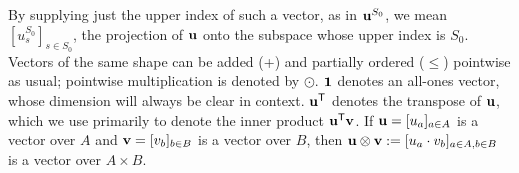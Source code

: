 \documentclass[twoside]{article}
\begin{document}
By supplying just the upper index of such a vector, as in $\mathbf{u}^{S_0}$,
we mean $[u^{S_0}_s]_{s \in {S_0}}$, the projection of $\mathbf{u}$ onto the subspace whose upper index is $S_0$.
Vectors of the same shape
 can be added (+) and partially ordered ($\le$) pointwise as usual; pointwise multiplication is denoted by $\odot$.
$\mathbf{1}$ denotes an all-ones vector, whose dimension will always be clear in context.
$\mathbf{u}^{\sf T}$ denotes the transpose of $\mathbf{u}$, which we use primarily to denote the inner product $\mathbf{u}^{\sf T} \mathbf{v}$.
If $\mathbf{u} = [u_a]_{a \in A}$ is a vector over $A$ and $\mathbf{v} = [v_b]_{b \in B}$ is a vector over $B$, then $\mathbf{u} \mathbin{\otimes} \mathbf{v} := [ u_a \cdot v_b ]_{a \in A, b \in B}$ is a vector over $A \times B$.

\end{document}
